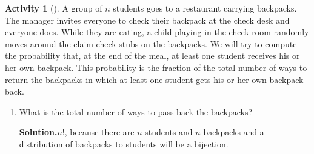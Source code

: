 \documentclass[10pt,]{book}
\theoremstyle{plain}
\theoremstyle{definition}
\newtheorem{activity}[project]{Activity}
\numberwithin{equation}{chapter}
\begin{document}
\begin{activity}[]\label{hatcheck}
A group of \(n\) students goes to a restaurant carrying backpacks. The manager invites everyone to check their backpack at the check desk and everyone does. While they are eating, a child playing in the check room randomly moves around the claim check stubs on the backpacks. We will try to compute the probability that, at the end of the meal, at least one student receives his or her own backpack.  This probability is the fraction of the total number of ways to return the backpacks in which at least one student gets his or her own backpack back.%
~\par
\begin{enumerate}[label=(\alph*)]
 \item What is the total number of ways to pass back the backpacks?%
\par\medskip\noindent%
\textbf{Solution.}\quad \(n!\), because there are \(n\) students and \(n\) backpacks and a distribution of backpacks to students will be a bijection.%


\end{enumerate}
\end{activity}
\end{document}
